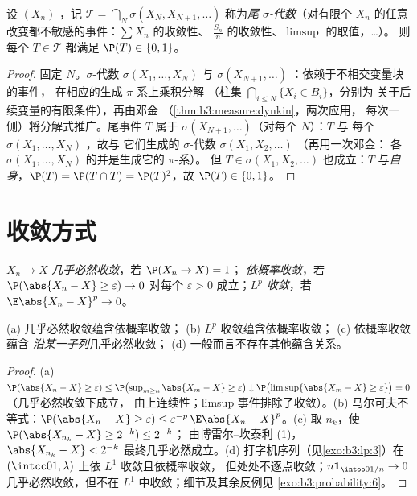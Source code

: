 \begin{theorem}[柯尔莫哥洛夫 0--1 律]
\label{thm:b3:probability:zeroone}
设 $(X_n)$ ，记 $\mathcal T =
\bigcap_N\sigma(X_N, X_{N+1}, \dots)$ 称为\emph{尾
$\sigma$-代数}（对有限个
$X_n$ 的任意改变都不敏感的事件：$\sum X_n$ 的收敛性、
$\frac{S_n}n$ 的收敛性、$\limsup$ 的取值，\dots）。
则每个 $T \in \mathcal T$ 都满足 $\P(T) \in \{0,
1\}$。
\end{theorem}

\begin{proof}
固定 $N$。$\sigma$-代数 $\sigma(X_1, \dots, X_N)$ 与
$\sigma(X_{N+1}, \dots)$ ：依赖于不相交变量块的事件，
在相应的生成 $\pi$-系上乘积分解
（柱集 $\bigcap_{i\leq N}\{X_i \in B_i\}$，分别为
关于后续变量的有限条件），再由邓金
（\cref{thm:b3:measure:dynkin}，两次应用，
每次一侧）将分解式推广。尾事件 $T$ 属于
$\sigma(X_{N+1}, \dots)$（对每个 $N$）：$T$ 与
每个 $\sigma(X_1, \dots, X_N)$ ，故与
它们生成的 $\sigma$-代数 $\sigma(X_1, X_2, \dots)$ （再用一次邓金：
各 $\sigma(X_1,\dots,X_N)$ 的并是生成它的 $\pi$-系）。
但 $T \in \sigma(X_1, X_2, \dots)$ 也成立：$T$
与\emph{自身}，$\P(T) = \P(T\cap T) =
\P(T)^2$，故 $\P(T) \in \{0, 1\}$。
\end{proof}

\section{收敛方式}

\begin{definition}\label{def:b3:probability:modes}
$X_n \to X$ \emph{几乎必然收敛}，若 $\P(X_n \to X) = 1$；
\emph{依概率收敛}，若 $\P(\abs{X_n - X} \geq \varepsilon)
\to 0$ 对每个 $\varepsilon > 0$ 成立；\emph{$L^p$ 收敛}，若
$\E\abs{X_n - X}^p \to 0$。
\end{definition}

\begin{proposition}\label{prop:b3:probability:modes}
(a) 几乎必然收敛蕴含依概率收敛；
(b) $L^p$ 收敛蕴含依概率收敛；
(c) 依概率收敛蕴含
\emph{沿某一子列}几乎必然收敛；
(d) 一般而言不存在其他蕴含关系。
\end{proposition}

\begin{proof}
(a) $\P(\abs{X_n - X} \geq \varepsilon) \leq
\P\bigl(\sup_{m\geq n}\abs{X_m - X} \geq \varepsilon\bigr)
\downarrow \P\bigl(\limsup\{\abs{X_m - X} \geq
\varepsilon\}\bigr) = 0$（几乎必然收敛下成立，
由上连续性；limsup 事件排除了收敛）。(b)
马尔可夫不等式：$\P(\abs{X_n - X} \geq \varepsilon) \leq
\varepsilon^{-p}\,\E\abs{X_n - X}^p$。(c) 取 $n_k$，使
$\P(\abs{X_{n_k} - X} \geq 2^{-k}) \leq 2^{-k}$；
由博雷尔–坎泰利 (1)，$\abs{X_{n_k} - X} < 2^{-k}$
最终几乎必然成立。(d) 打字机序列（见\cref{exo:b3:lp:3}）在
$(\intcc01, \lambda)$ 上依 $L^1$ 收敛且依概率收敛，
但处处不逐点收敛；$n\mathbf 1_{\intoo0{1/n}} \to 0$
几乎必然收敛，但不在 $L^1$ 中收敛；细节及其余反例见
\cref{exo:b3:probability:6}。
\end{proof}

